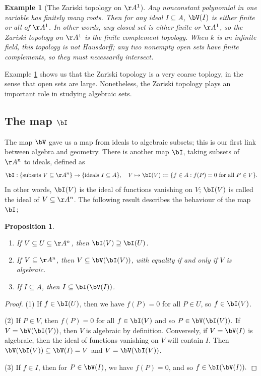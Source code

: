 \documentclass[12pt]{amsart}
\theoremstyle{plain}
\newtheorem{proposition}[theorem]{Proposition}
\newtheorem{example}[theorem]{Example}
\begin{document}
\begin{example}[The Zariski topology on $\AA^1$]\label{zariskia1}
Any nonconstant polynomial in one variable has finitely many roots.
Then for any ideal $I \subseteq A$, $\bV(I)$ is either finite or all of $\AA^1$.
In other words, any closed set is either finite or $\AA^1$, so the Zariski topology on $\AA^1$ is the finite complement topology.
When $k$ is an infinite field, this topology is not Hausdorff; any two nonempty open sets have finite complements, so they must necessarily intersect.
\end{example}

Example \ref{zariskia1} shows us that the Zariski topology is a very coarse toplogy, in the sense that open sets are large.
Nonetheless, the Zariski topology plays an important role in studying algebraic sets.

\subsection{The map $\bI$}
The map $\bV$ gave us a map from ideals to algebraic subsets; this is our first link between algebra and geometry.
There is another map $\bI$, taking subsets of $\AA^n$ to ideals, defined as
$$\bI: \{\text{subsets } V \subseteq \AA^n\} \to \{\text{ideals } I \subseteq A\}, \quad V\mapsto \bI(V) := \{f \in A : f(P) = 0 \text{ for all } P \in V\}.$$
In other words, $\bI(V)$ is the ideal of functions vanishing on $V$; $\bI(V)$ is called the ideal of $V \subseteq \AA^n$.
The following result describes the behaviour of the map $\bI$;

\begin{proposition}\label{iproperties}
\begin{enumerate}
\item If $V \subseteq U \subseteq \AA^n$, then $\bI(V) \supseteq \bI(U)$.
\item If $V \subseteq \AA^n$, then $V \subseteq \bV(\bI(V))$, with equality if and only if $V$ is algebraic.
\item If $I \subseteq A$, then $I \subseteq \bI(\bV(I))$.
\end{enumerate}
\end{proposition}
\begin{proof}
(1) If $f \in \bI(U)$, then we have $f(P) = 0$ for all $P \in U$, so $f \in \bI(V)$.

(2) If $P \in V$, then $f(P) = 0$ for all $f \in \bI(V)$ and so $P \in \bV(\bI(V)).$
If $V = \bV(\bI(V))$, then $V$ is algebraic by definition.
Conversely, if $V = \bV(I)$ is algebraic, then the ideal of functions vanishing on $V$ will contain $I$.
Then $\bV(\bI(V)) \subseteq \bV(I) = V$ and $V = \bV(\bI(V))$.

(3) If $f \in I$, then for $P \in \bV(I)$, we have $f(P) = 0$, and so $f \in \bI(\bV(I)).$
\end{proof}
\end{document}
